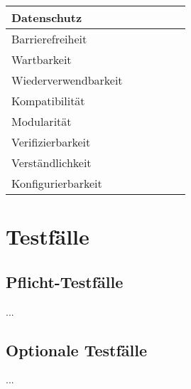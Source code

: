 \begin{center}
\begin{longtable}{|l|c|c|c|c|c|}
		\hline

		Datenschutz &  &  &  &  &  \\
		
		\hline
		
		Barrierefreiheit &  &  &  &  &  \\
				
		\hline

		Wartbarkeit &  &  &  &  &  \\
		
		\hline

		Wiederverwendbarkeit &  &  &  &  &  \\
		
		\hline

		Kompatibilität &  &  &  &  &  \\
		
		\hline

		Modularität &  &  &  &  &  \\
		
		\hline

		Verifizierbarkeit &  &  &  &  &  \\
		
		\hline

		Verständlichkeit &  &  &  &  &  \\
		
		\hline

		Konfigurierbarkeit &  &  &  &  &  \\
		
		\hline
	
	\end{longtable}

\end{center}


\section{Testfälle}

\subsection*{Pflicht-Testfälle}

...
\\


\subsection*{Optionale Testfälle}

...
\\
